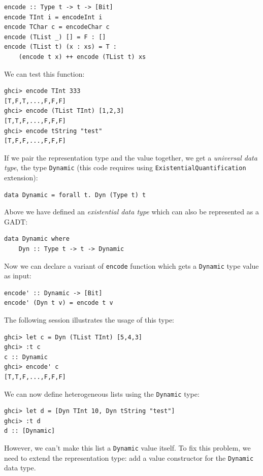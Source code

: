 \documentclass{tmr}
\newcommand{\italic}[1]{\textit{#1}}
\begin{document}
\begin{Verbatim}
encode :: Type t -> t -> [Bit]
encode TInt i = encodeInt i
encode TChar c = encodeChar c
encode (TList _) [] = F : []
encode (TList t) (x : xs) = T :
    (encode t x) ++ encode (TList t) xs
\end{Verbatim}

We can test this function:

\begin{Verbatim}
ghci> encode TInt 333
[T,F,T,...,F,F,F]
ghci> encode (TList TInt) [1,2,3]
[T,T,F,...,F,F,F]
ghci> encode tString "test"
[T,F,F,...,F,F,F]
\end{Verbatim}

If we pair the representation type and the value together, we get a \italic{universal data type}, the type \verb|Dynamic| (this code requires using \verb|ExistentialQuantification| extension):

\begin{Verbatim}
data Dynamic = forall t. Dyn (Type t) t
\end{Verbatim}

Above we have defined an \italic{existential data type} which can also be represented as a GADT:

\begin{Verbatim}
data Dynamic where
    Dyn :: Type t -> t -> Dynamic
\end{Verbatim}

Now we can declare a variant of \verb|encode| function which gets a \verb|Dynamic| type value as input:

\begin{Verbatim}
encode' :: Dynamic -> [Bit]
encode' (Dyn t v) = encode t v
\end{Verbatim}

The following session illustrates the usage of this type:

\begin{Verbatim}
ghci> let c = Dyn (TList TInt) [5,4,3]
ghci> :t c
c :: Dynamic
ghci> encode' c
[T,T,F,...,F,F,F]
\end{Verbatim}

We can now define heterogeneous lists using the \verb|Dynamic| type:

\begin{Verbatim}
ghci> let d = [Dyn TInt 10, Dyn tString "test"]
ghci> :t d
d :: [Dynamic]
\end{Verbatim}

However, we can't make this list a \verb|Dynamic| value itself. To fix this problem, we need to extend the representation type: add a value constructor for the \verb|Dynamic| data type.
\end{document}
